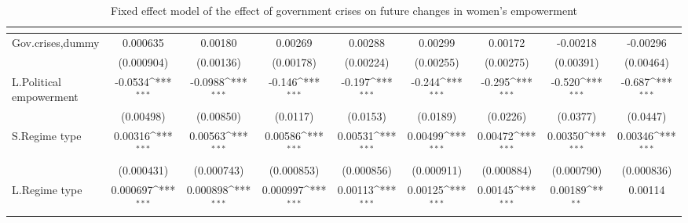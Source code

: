 \begin{table}[htbp]\centering
\def\sym#1{\ifmmode^{#1}\else\(^{#1}\)\fi}
\caption{Fixed effect model of the effect of government crises on future changes in women's empowerment \label{polemgovnowar}}
\begin{tabular}{l*{8}{c}}
\hline\hline
                    &&&&&&&&\\
\hline
Gov.crises,dummy    &    0.000635         &     0.00180         &     0.00269         &     0.00288         &     0.00299         &     0.00172         &    -0.00218         &    -0.00296         \\
                    &  (0.000904)         &   (0.00136)         &   (0.00178)         &   (0.00224)         &   (0.00255)         &   (0.00275)         &   (0.00391)         &   (0.00464)         \\
[1em]
L.Political empowerment&     -0.0534\sym{***}&     -0.0988\sym{***}&      -0.146\sym{***}&      -0.197\sym{***}&      -0.244\sym{***}&      -0.295\sym{***}&      -0.520\sym{***}&      -0.687\sym{***}\\
                    &   (0.00498)         &   (0.00850)         &    (0.0117)         &    (0.0153)         &    (0.0189)         &    (0.0226)         &    (0.0377)         &    (0.0447)         \\
[1em]
S.Regime type       &     0.00316\sym{***}&     0.00563\sym{***}&     0.00586\sym{***}&     0.00531\sym{***}&     0.00499\sym{***}&     0.00472\sym{***}&     0.00350\sym{***}&     0.00346\sym{***}\\
                    &  (0.000431)         &  (0.000743)         &  (0.000853)         &  (0.000856)         &  (0.000911)         &  (0.000884)         &  (0.000790)         &  (0.000836)         \\
[1em]
L.Regime type       &    0.000697\sym{***}&    0.000898\sym{***}&    0.000997\sym{***}&     0.00113\sym{***}&     0.00125\sym{***}&     0.00145\sym{***}&     0.00189\sym{**} &     0.00114         \\

\end{tabular}
\end{table}
